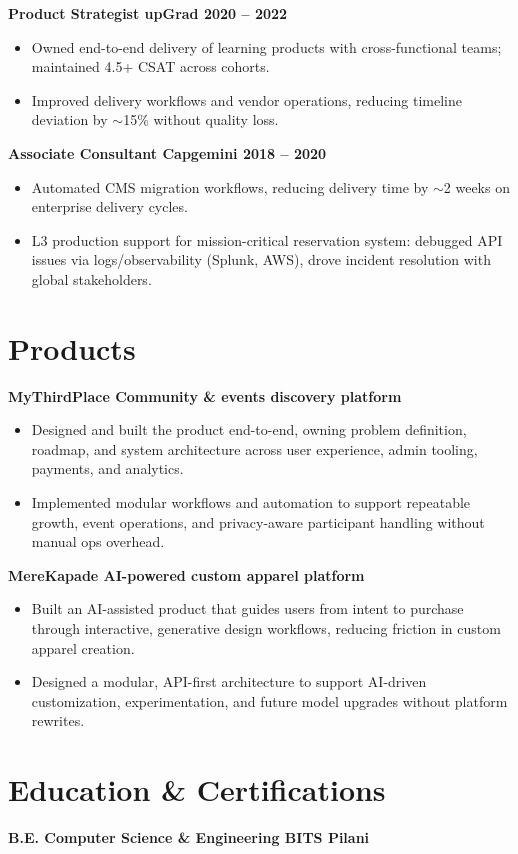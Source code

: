 \documentclass[10pt,a4paper]{article}
\begin{document}
\textbf{Product Strategist \textbar{} upGrad \textbar{} 2020 -- 2022}
\begin{itemize}[leftmargin=*, nosep]
  \item Owned end-to-end delivery of learning products with cross-functional teams; maintained 4.5+ CSAT across cohorts.
  \item Improved delivery workflows and vendor operations, reducing timeline deviation by $\sim$15\% without quality loss.
\end{itemize}

\textbf{Associate Consultant \textbar{} Capgemini \textbar{} 2018 -- 2020}
\begin{itemize}[leftmargin=*, nosep]
  \item Automated CMS migration workflows, reducing delivery time by $\sim$2 weeks on enterprise delivery cycles.
  \item L3 production support for mission-critical reservation system: debugged API issues via logs/observability (Splunk, AWS), drove incident resolution with global stakeholders.
\end{itemize}

\section*{Products}

\textbf{MyThirdPlace \textbar{} Community \& events discovery platform}
\begin{itemize}[leftmargin=*, nosep]
  \item Designed and built the product end-to-end, owning problem definition, roadmap, and system architecture across user experience, admin tooling, payments, and analytics.
  \item Implemented modular workflows and automation to support repeatable growth, event operations, and privacy-aware participant handling without manual ops overhead.
\end{itemize}

\textbf{MereKapade \textbar{} AI-powered custom apparel platform}
\begin{itemize}[leftmargin=*, nosep]
  \item Built an AI-assisted product that guides users from intent to purchase through interactive, generative design workflows, reducing friction in custom apparel creation.
  \item Designed a modular, API-first architecture to support AI-driven customization, experimentation, and future model upgrades without platform rewrites.
\end{itemize}

\section*{Education \& Certifications}
\textbf{B.E. Computer Science \& Engineering \textbar{} BITS Pilani}
\end{document}

